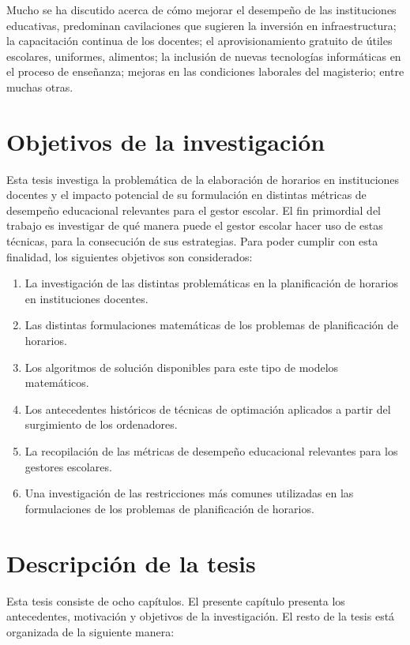\documentclass[spanish,draft,12pt,headsepline,footsepline,paper=letter]{scrreprt}
\begin{document}
Mucho se ha discutido acerca de cómo mejorar el desempeño de las instituciones educativas, predominan cavilaciones que sugieren la inversión en infraestructura; la capacitación continua de los docentes; el aprovisionamiento gratuito de útiles escolares, uniformes, alimentos; la  inclusión de nuevas tecnologías informáticas en el proceso de enseñanza; mejoras en las condiciones laborales del magisterio; entre muchas otras. 

\section{Objetivos de la investigación}

Esta tesis investiga la problemática de la elaboración de horarios en instituciones docentes y el impacto potencial de su formulación en distintas métricas de desempeño educacional relevantes para el gestor escolar.
El fin primordial del trabajo es investigar de qué manera puede el gestor escolar hacer uso de estas técnicas, para la consecución de sus estrategias.
Para poder cumplir con esta finalidad, los siguientes objetivos son considerados:
\begin{enumerate}[1]
\item La investigación de las distintas problemáticas en la planificación de horarios en instituciones docentes.
\item Las distintas formulaciones matemáticas de los problemas de planificación de horarios.
\item Los algoritmos de solución disponibles para este tipo de modelos matemáticos.
\item Los antecedentes históricos de técnicas de optimación aplicados a partir del surgimiento de los ordenadores.
\item La recopilación de las métricas de desempeño educacional relevantes para los gestores escolares.
\item Una investigación de las restricciones más comunes utilizadas en las formulaciones de los problemas de planificación de horarios.
\end{enumerate}

\section{Descripción de la tesis}

Esta tesis consiste de ocho capítulos. El presente capítulo presenta los antecedentes, motivación y objetivos de la investigación. El resto de la tesis está organizada de la siguiente manera:
\end{document}
